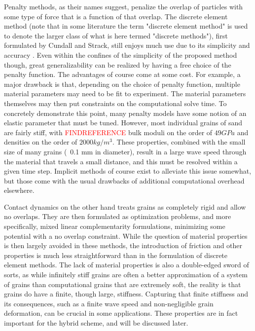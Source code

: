 Penalty methods, as their names suggest, penalize the overlap of particles with some type of force that is a function of that overlap. The discrete element method (note that in some literature the term "discrete element method" is used to denote the larger class of what is here termed "discrete methods"), first formulated by Cundall and Strack, still enjoys much use due to its simplicity and accuracy \cite{Cundall:1979}. Even within the confines of the simplicity of the proposed method though, great generalizability can be realized by having a free choice of the penalty function. The advantages of course come at some cost. For example, a major drawback is that, depending on the choice of penalty function, multiple material parameters may need to be fit to experiment. The material parameters themselves may then put constraints on the computational solve time. To concretely demonstrate this point, many penalty models have some notion of an elastic parameter that must be tuned. However, most individual grains of sand are fairly stiff, with \textcolor{red}{FINDREFERENCE} bulk moduli on the order of $49 GPa$ and densities on the order of $2000 kg/m^3$. These properties, combined with the small size of many grains (~0.1 mm in diameter), result in a large wave speed through the material that travels a small distance, and this must be resolved within a given time step. Implicit methods of course exist to alleviate this issue somewhat, but those come with the usual drawbacks of additional computational overhead elsewhere.

Contact dynamics on the other hand treats grains as completely rigid and allow no overlaps. They are then formulated as optimization problems, and more specifically, mixed linear complementarity formulations, minimizing some potential with a no overlap constraint. While the question of material properties is then largely avoided in these methods, the introduction of friction and other properties is much less straightforward than in the formulation of discrete element methods. The lack of material properties is also a double-edged sword of sorts, as while infinitely stiff grains are often a better approximation of a system of grains than computational grains that are extremely soft, the reality is that grains do have a finite, though large, stiffness. Capturing that finite stiffness and its consequences, such as a finite wave speed and non-negligible grain deformation, can be crucial in some applications. These properties are in fact important for the hybrid scheme, and will be discussed later.

